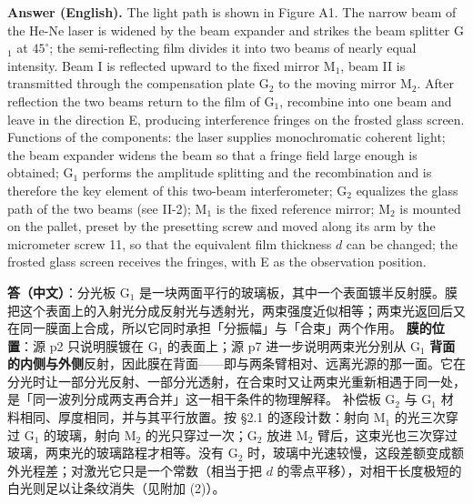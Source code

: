 \documentclass[11pt]{ctexart}
\newcommand{\Dl}{d}
\newcommand{\qaneed}[1]{\needspace{#1\textheight}}
\begin{document}
\textbf{Answer (English).} The light path is shown in Figure A1. The narrow beam of the He-Ne laser is widened by the beam expander and strikes the beam splitter G$_1$ at $45^\circ$; the semi-reflecting film divides it into two beams of nearly equal intensity. Beam I is reflected upward to the fixed mirror M$_1$, beam II is transmitted through the compensation plate G$_2$ to the moving mirror M$_2$. After reflection the two beams return to the film of G$_1$, recombine into one beam and leave in the direction E, producing interference fringes on the frosted glass screen.
Functions of the components: the laser supplies monochromatic coherent light; the beam expander widens the beam so that a fringe field large enough is obtained; G$_1$ performs the amplitude splitting and the recombination and is therefore the key element of this two-beam interferometer; G$_2$ equalizes the glass path of the two beams (see II-2); M$_1$ is the fixed reference mirror; M$_2$ is mounted on the pallet, preset by the presetting screw and moved along its arm by the micrometer screw 11, so that the equivalent film thickness $\Dl$ can be changed; the frosted glass screen receives the fringes, with E as the observation position.

\qaneed{0.68}


\textbf{答（中文）}：分光板 G$_1$ 是一块两面平行的玻璃板，其中一个表面镀半反射膜。膜把这个表面上的入射光分成反射光与透射光，两束强度近似相等；两束光返回后又在同一膜面上合成，所以它同时承担「分振幅」与「合束」两个作用。
\textbf{膜的位置}：源 p2 只说明膜镀在 G$_1$ 的表面上；源 p7 进一步说明两束光分别从 G$_1$ \textbf{背面的内侧与外侧}反射，因此膜在背面——即与两条臂相对、远离光源的那一面。它在分光时让一部分光反射、一部分光透射，在合束时又让两束光重新相遇于同一处，是「同一波列分成两支再合并」这一相干条件的物理解释。
补偿板 G$_2$ 与 G$_1$ 材料相同、厚度相同，并与其平行放置。按 §2.1 的逐段计数：射向 M$_1$ 的光三次穿过 G$_1$ 的玻璃，射向 M$_2$ 的光只穿过一次；G$_2$ 放进 M$_2$ 臂后，这束光也三次穿过玻璃，两束光的玻璃路程才相等。没有 G$_2$ 时，玻璃中光速较慢，这段差额变成额外光程差；对激光它只是一个常数（相当于把 $\Dl$ 的零点平移），对相干长度极短的白光则足以让条纹消失（见附加 (2)）。
\end{document}
